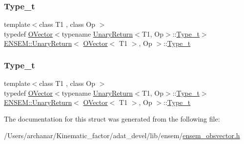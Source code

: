 \subsubsection{\texorpdfstring{Type\_t}{Type\_t}\hspace{0.1cm}{\footnotesize\ttfamily [1/2]}}
{\footnotesize\ttfamily template$<$class T1 , class Op $>$ \\
typedef \mbox{\hyperlink{classENSEM_1_1OVector}{O\+Vector}}$<$typename \mbox{\hyperlink{structENSEM_1_1UnaryReturn}{Unary\+Return}}$<$T1, Op$>$\+::\mbox{\hyperlink{structENSEM_1_1UnaryReturn_3_01OVector_3_01T1_01_4_00_01Op_01_4_a271ecea83fd5cd6b106bd500ff150660}{Type\+\_\+t}}$>$ \mbox{\hyperlink{structENSEM_1_1UnaryReturn}{E\+N\+S\+E\+M\+::\+Unary\+Return}}$<$ \mbox{\hyperlink{classENSEM_1_1OVector}{O\+Vector}}$<$ T1 $>$, Op $>$\+::\mbox{\hyperlink{structENSEM_1_1UnaryReturn_3_01OVector_3_01T1_01_4_00_01Op_01_4_a271ecea83fd5cd6b106bd500ff150660}{Type\+\_\+t}}}

\mbox{\label{structENSEM_1_1UnaryReturn_3_01OVector_3_01T1_01_4_00_01Op_01_4_a271ecea83fd5cd6b106bd500ff150660}} 
\subsubsection{\texorpdfstring{Type\_t}{Type\_t}\hspace{0.1cm}{\footnotesize\ttfamily [2/2]}}
{\footnotesize\ttfamily template$<$class T1 , class Op $>$ \\
typedef \mbox{\hyperlink{classENSEM_1_1OVector}{O\+Vector}}$<$typename \mbox{\hyperlink{structENSEM_1_1UnaryReturn}{Unary\+Return}}$<$T1, Op$>$\+::\mbox{\hyperlink{structENSEM_1_1UnaryReturn_3_01OVector_3_01T1_01_4_00_01Op_01_4_a271ecea83fd5cd6b106bd500ff150660}{Type\+\_\+t}}$>$ \mbox{\hyperlink{structENSEM_1_1UnaryReturn}{E\+N\+S\+E\+M\+::\+Unary\+Return}}$<$ \mbox{\hyperlink{classENSEM_1_1OVector}{O\+Vector}}$<$ T1 $>$, Op $>$\+::\mbox{\hyperlink{structENSEM_1_1UnaryReturn_3_01OVector_3_01T1_01_4_00_01Op_01_4_a271ecea83fd5cd6b106bd500ff150660}{Type\+\_\+t}}}



The documentation for this struct was generated from the following file\+:\begin{DoxyCompactItemize}
\item 
/\+Users/archanar/\+Kinematic\+\_\+factor/adat\+\_\+devel/lib/ensem/\mbox{\hyperlink{lib_2ensem_2ensem__obsvector_8h}{ensem\+\_\+obsvector.\+h}}\end{DoxyCompactItemize}
